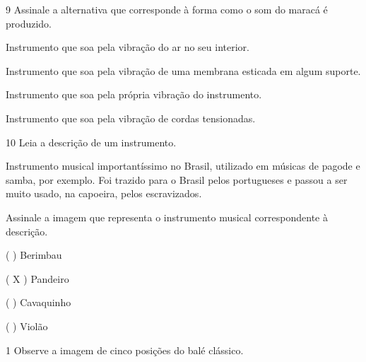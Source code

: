 \num{9}  Assinale a alternativa que corresponde à forma como o som do maracá é produzido.

\begin{boxlist}
 Instrumento que soa pela vibração do ar no seu interior.

 Instrumento que soa pela vibração de uma membrana esticada em algum suporte.

 Instrumento que soa pela própria vibração do instrumento.

 Instrumento que soa pela vibração de cordas tensionadas.
\end{boxlist}


\num{10} Leia a descrição de um instrumento.

Instrumento musical importantíssimo no Brasil, utilizado em músicas
de pagode e samba, por exemplo. Foi trazido para o Brasil pelos portugueses
e passou a ser muito usado, na capoeira, pelos escravizados.

Assinale a imagem que representa o instrumento musical correspondente à descrição.

( )
Berimbau


( X )
Pandeiro

( )
Cavaquinho


( )
Violão



\num{1} Observe a imagem de cinco posições do balé clássico.

%
%
%
%
%
%
%
%

